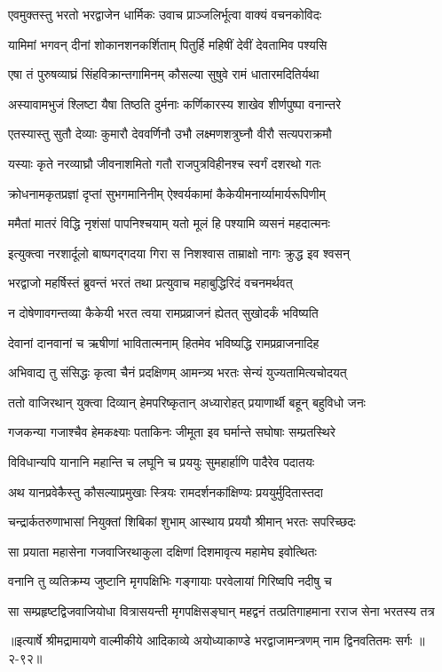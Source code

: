 \twolineshloka
{एवमुक्तस्तु भरतो भरद्वाजेन धार्मिकः}
{उवाच प्राञ्जलिर्भूत्वा वाक्यं वचनकोविदः} %

\twolineshloka
{यामिमां भगवन् दीनां शोकानशनकर्शिताम्}
{पितुर्हि महिषीं देवीं देवतामिव पश्यसि} %

\twolineshloka
{एषा तं पुरुषव्याघ्रं सिंहविक्रान्तगामिनम्}
{कौसल्या सुषुवे रामं धातारमदितिर्यथा} %

\twolineshloka
{अस्यावामभुजं श्लिष्टा यैषा तिष्ठति दुर्मनाः}
{कर्णिकारस्य शाखेव शीर्णपुष्पा वनान्तरे} %

\twolineshloka
{एतस्यास्तु सुतौ देव्याः कुमारौ देववर्णिनौ}
{उभौ लक्ष्मणशत्रुघ्नौ वीरौ सत्यपराक्रमौ} %

\twolineshloka
{यस्याः कृते नरव्याघ्रौ जीवनाशमितो गतौ}
{राजपुत्रविहीनश्च स्वर्गं दशरथो गतः} %

\twolineshloka
{क्रोधनामकृतप्रज्ञां दृप्तां सुभगमानिनीम्}
{ऐश्वर्यकामां कैकेयीमनार्य्यामार्यरूपिणीम्} %

\twolineshloka
{ममैतां मातरं विद्धि नृशंसां पापनिश्चयाम्}
{यतो मूलं हि पश्यामि व्यसनं महदात्मनः} %

\twolineshloka
{इत्युक्त्वा नरशार्दूलो बाष्पगद्गदया गिरा}
{स निशश्वास ताम्राक्षो नागः क्रुद्ध इव श्वसन्} %

\twolineshloka
{भरद्वाजो महर्षिस्तं ब्रुवन्तं भरतं तथा}
{प्रत्युवाच महाबुद्धिरिदं वचनमर्थवत्} %

\twolineshloka
{न दोषेणावगन्तव्या कैकेयी भरत त्वया}
{रामप्रव्राजनं ह्येतत् सुखोदर्कं भविष्यति} %

\twolineshloka
{देवानां दानवानां च ऋषीणां भावितात्मनाम्}
{हितमेव भविष्यद्धि रामप्रव्राजनादिह} %

\twolineshloka
{अभिवाद्य तु संसिद्धः कृत्वा चैनं प्रदक्षिणम्}
{आमन्त्र्य भरतः सेन्यं युज्यतामित्यचोदयत्} %

\twolineshloka
{ततो वाजिरथान् युक्त्वा दिव्यान् हेमपरिष्कृतान्}
{अध्यारोहत् प्रयाणार्थी बहून् बहुविधो जनः} %

\twolineshloka
{गजकन्या गजाश्चैव हेमकक्ष्याः पताकिनः}
{जीमूता इव घर्मान्ते सघोषाः सम्प्रतस्थिरे} %

\twolineshloka
{विविधान्यपि यानानि महान्ति च लघूनि च}
{प्रययुः सुमहार्हाणि पादैरेव पदातयः} %

\twolineshloka
{अथ यानप्रवेकैस्तु कौसल्याप्रमुखाः स्त्रियः}
{रामदर्शनकांक्षिण्यः प्रययुर्मुदितास्तदा} %

\twolineshloka
{चन्द्रार्कतरुणाभासां नियुक्तां शिबिकां शुभाम्}
{आस्थाय प्रययौ श्रीमान् भरतः सपरिच्छदः} %

\twolineshloka
{सा प्रयाता महासेना गजवाजिरथाकुला}
{दक्षिणां दिशमावृत्य महामेघ इवोत्थितः} %

\twolineshloka
{वनानि तु व्यतिक्रम्य जुष्टानि मृगपक्षिभिः}
{गङ्गायाः परवेलायां गिरिष्वपि नदीषु च} %

\twolineshloka
{सा सम्प्रहृष्टद्विजवाजियोधा वित्रासयन्ती मृगपक्षिसङ्घान्}
{महद्वनं तत्प्रतिगाहमाना रराज सेना भरतस्य तत्र} %


॥इत्यार्षे श्रीमद्रामायणे वाल्मीकीये आदिकाव्ये अयोध्याकाण्डे भरद्वाजामन्त्रणम् नाम द्विनवतितमः सर्गः ॥२-९२॥
